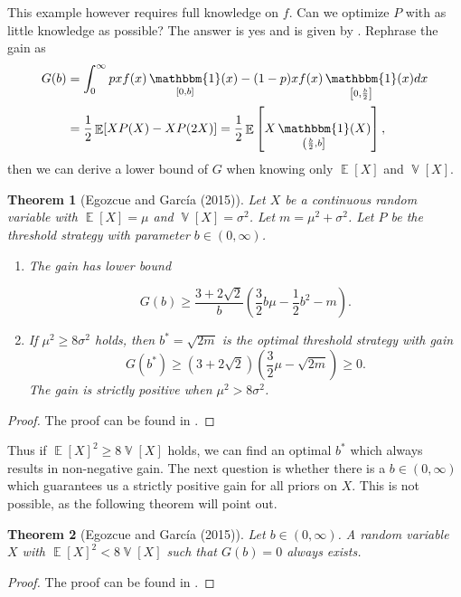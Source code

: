 \documentclass[a4paper]{report}
\theoremstyle{plain}
\newtheorem{theorem}{Theorem}[section]
\theoremstyle{definition}
\theoremstyle{remark}
\numberwithin{equation}{chapter}
\DeclareMathOperator{\V}{\mathbb{V}}
\DeclareMathOperator{\E}{\mathbb{E}}
\DeclareMathOperator{\1}{\mathbbm{1}}
\begin{document}
This example however requires full knowledge on $f$. Can we optimize $P$ with as little knowledge as possible? The answer is yes and is given by \cite{Egozcue15}. Rephrase the gain as
\begin{align}
G(b)&=\int_0^\infty pxf(x)\1_{[0,b]}(x)-(1-p)xf(x)\1_{\left[0,\frac{b}{2}\right]}(x)dx\\
&=\frac{1}{2}\E[XP(X)-XP(2X)]=\frac{1}{2}\E\left[X\1_{\left(\frac{b}{2},b\right]}(X)\right],
\end{align}
then we can derive a lower bound of $G$ when knowing only $\E[X]$ and $\V[X]$.
\begin{theorem}[Egozcue and García (2015)]\label{thm:EnvelopeSwitchBound}
Let $X$ be a continuous random variable with $\E[X]=\mu$ and $\V[X]=\sigma^2$. Let $m=\mu^2+\sigma^2$. Let $P$ be the threshold strategy with parameter $b\in(0,\infty)$.
\begin{enumerate}
    \item The gain has lower bound

       \begin{equation}
    G(b)\geq\frac{3+2\sqrt{2}}{b}\left(\frac{3}{2}b\mu-\frac{1}{2}b^2-m\right).
    \end{equation}
    \item If $\mu^2\geq 8\sigma^2$ holds, then $b^*=\sqrt{2m}$ is the optimal threshold strategy with gain
        \begin{equation}
    G(b^*)\geq(3+2\sqrt{2})\left(\frac{3}{2}\mu-\sqrt{2m}\right)\geq0.
    \end{equation}
    The gain is strictly positive when $\mu^2>8\sigma^2$.
\end{enumerate}
\end{theorem}
\begin{proof}
The proof can be found in \cite{Egozcue15}.
\end{proof}
Thus if $\E[X]^2\geq8\V[X]$ holds, we can find an optimal $b^*$ which always results in non-negative gain. The next question is whether there is a $b\in(0,\infty)$ which guarantees us a strictly positive gain for all priors on $X$. This is not possible, as the following theorem will point out.
\begin{theorem}[Egozcue and García (2015)]
Let $b\in(0,\infty)$. A random variable $X$ with $\E[X]^2<8\V[X]$ such that $G(b)=0$ always exists.
\end{theorem}
\begin{proof}
The proof can be found in \cite{Egozcue15}.
\end{proof}
\end{document}
